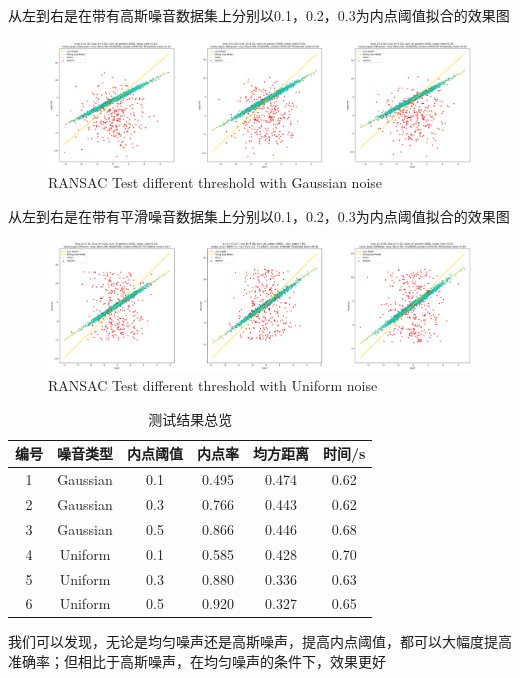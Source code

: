 \documentclass{seuer}
\begin{document}
从左到右是在带有高斯噪音数据集上分别以0.1，0.2，0.3为内点阈值拟合的效果图
\begin{figure}[H]
  \centering
  \includegraphics[scale=0.1]{./image/test_threshold_Gaussian.png}
  \caption{RANSAC Test different threshold with Gaussian noise} \label{fig:eg}
\end{figure}
从左到右是在带有平滑噪音数据集上分别以0.1，0.2，0.3为内点阈值拟合的效果图
\begin{figure}[H]
  \centering
  \includegraphics[scale=0.1]{./image/test_threshold_Uniform.png}
  \caption{RANSAC Test different threshold with Uniform noise} \label{fig:eg}
\end{figure}

\begin{table}[h]
  \centering
  \captionnamefont{\wuhao\bf\heiti}
  \captiontitlefont{\wuhao\bf\heiti}
  \caption{测试结果总览} \label{tab:eg1}
  \liuhao
  \begin{tabular}{cccccc}
  \toprule
  {编号} & {噪音类型} & {内点阈值} & {内点率} & {均方距离} & {时间/s} \\
  \midrule 
  1 & Gaussian & 0.1 & 0.495 & 0.474 & 0.62 \\
  2 & Gaussian & 0.3 & 0.766 & 0.443 & 0.62 \\
  3 & Gaussian & 0.5 & 0.866 & 0.446 & 0.68\\
  4 & Uniform  & 0.1 & 0.585 & 0.428 & 0.70\\
  5 & Uniform  & 0.3 & 0.880 & 0.336 & 0.63\\
  6 & Uniform  & 0.5 & 0.920 & 0.327 & 0.65\\
  \bottomrule
  \end{tabular}
\end{table}
我们可以发现，无论是均匀噪声还是高斯噪声，提高内点阈值，都可以大幅度提高准确率；但相比于高斯噪声，在均匀噪声的条件下，效果更好
\end{document}
